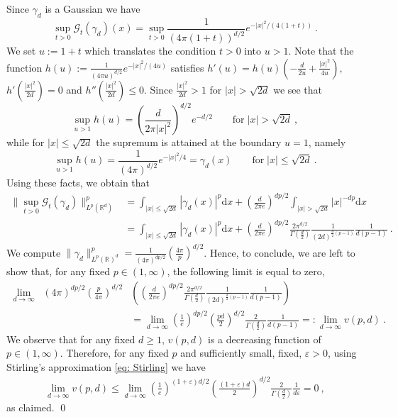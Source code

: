 \documentclass[a4paper, reqno]{amsart}
\theoremstyle{definition}
\newcommand{\dd}{{\mathrm d}}
\newcommand{\mG}{\mathcal{G}}
\begin{document}
Since $\gamma_d$ is a Gaussian we have 
$$\sup_{t>0} \mG_t (\gamma_d)(x)=\sup_{t>0}\frac{1}{(4\pi(1+t))^{d/2}}e^{-|x|^2/(4(1+t))}~.$$
We set $u:=1+t$ which translates the condition $t>0$ into $u>1$. Note that the function $h(u):= \frac{1}{(4\pi u)^{d/2}}e^{-|x|^2/(4u)}$
satisfies $h'(u)=h(u)(-\frac{d}{2u}+\frac{|x|^2}{4u}),$ $h'(\frac{|x|^2}{2d})=0$ and $h''(\frac{|x|^2}{2d})\leq 0$. Since $\frac{|x|^2}{2d}>1$ for $|x|>\sqrt{2d}$ we see that
$$\sup_{u>1} h(u)=\left( \frac{d}{2\pi|x|^2}\right)^{d/2}e^{-d/2} \qquad \text{for}\; |x|>\sqrt{2d}~,$$
while for $|x|\leq \sqrt{2d}$ the supremum is attained at the boundary $u=1$, namely
$$\sup_{u>1} h(u)=\frac{1}{(4\pi )^{d/2}}e^{-|x|^2/4}=\gamma_d(x) \qquad \text{for}\; |x|\leq \sqrt{2d}~.$$
Using these facts, we obtain that
\begin{align*}
    \|\sup_{t>0} \mG_t (\gamma_d)\|_{L^p(\mathbb{R}^d)}^p &= \int_{|x|\leq \sqrt{2d}} |\gamma_d(x)|^p\dd x + \left(\frac{d}{2\pi e} \right)^{dp/2}\int_{|x|> \sqrt{2d}} |x|^{-dp}\dd x \\
    & =\int_{|x|\leq \sqrt{2d}} |\gamma_d(x)|^p\dd x  + \left(\frac{d}{2\pi e} \right)^{dp/2} \frac{2\pi^{d/2}}{\Gamma(\frac{d}{2})} \frac{1}{(2d)^{\frac{d}{2}(p-1)}} \frac{1}{d(p-1)}~.
\end{align*}
We compute $\|\gamma_d\|_{L^p(\mathbb{R})^d}^p=\frac{1}{(4\pi )^{dp/2}}(\frac{4\pi }{p})^{d/2}$. Hence, to conclude, we are left to show that, for any fixed $p\in(1,\infty)$, the following limit is equal to zero,
\begin{align*}
    \lim_{d\rightarrow\infty} \;\; (4\pi )^{dp/2} \left(\frac{p}{4\pi }\right)^{d/2}&\left( \left(\frac{d}{2\pi e} \right)^{dp/2} \frac{2\pi^{d/2}}{\Gamma(\frac{d}{2})} \frac{1}{(2d)^{\frac{d}{2}(p-1)}} \frac{1}{d(p-1)} \right)\\
    & = \lim_{d\rightarrow\infty} \left(\frac{1}{e}\right)^{dp/2}\left( \frac{pd}{2}\right)^{d/2}\frac{2}{\Gamma(\frac{d}{2})}\frac{1}{d(p-1)} =: \lim_{d\rightarrow\infty} v(p,d)~.
\end{align*}
We observe that for any fixed $d\geq 1$, $v(p,d)$ is a decreasing function of  $p\in (1,\infty)$. Therefore, for any fixed $p$ and sufficiently small, fixed, $\varepsilon>0$, using Stirling's approximation \eqref{eq: Stirling} we have 
\begin{align*}
   \lim_{d\rightarrow\infty} v(p,d)\leq  \lim_{d\rightarrow\infty}
   \left(\frac{1}{e}\right)^{(1+\varepsilon)d/2}\left( \frac{(1+\varepsilon)d}{2}\right)^{d/2}\frac{2}{\Gamma(\frac{d}{2})}\frac{1}{d\varepsilon} = 0~,
\end{align*}
as claimed.
\qed
\end{document}

